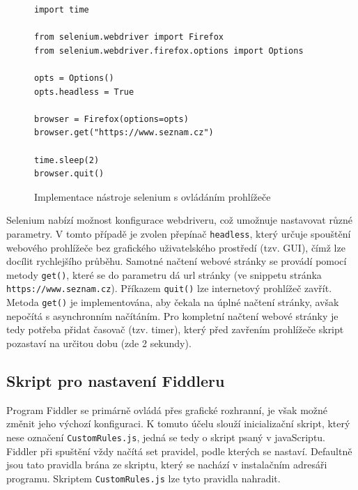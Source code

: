 \documentclass[thesis=M,czech,hidelinks]{FITthesis}[2013/05/06]
\begin{document}
\begin{figure}[h]               
\begin{verbatim}
import time

from selenium.webdriver import Firefox
from selenium.webdriver.firefox.options import Options

opts = Options()
opts.headless = True

browser = Firefox(options=opts)
browser.get("https://www.seznam.cz")

time.sleep(2)
browser.quit()
\end{verbatim}      
\caption{Implementace nástroje selenium s ovládáním prohlížeče}
\label{snip:selenium}
\end{figure}
Selenium nabízí možnost konfigurace webdriveru, což umožnuje nastavovat různé parametry. V tomto případě je zvolen přepínač \texttt{headless}, který určuje spouštění webového prohlížeče bez grafického uživatelského prostředí (tzv. GUI), čímž lze docílit rychlejšího průběhu. Samotné načtení webové stránky se provádí pomocí metody \texttt{get()}, které se do parametru dá url stránky (ve snippetu stránka \texttt{https://www.seznam.cz}). Příkazem \texttt{quit()} lze internetový prohlížeč zavřít. Metoda \texttt{get()} je implementována, aby čekala na úplné načtení stránky, avšak nepočítá s asynchronním načítáním. Pro kompletní načtení webové stránky je tedy potřeba přidat časovač (tzv. timer), který před zavřením prohlížeče skript pozastaví na určitou dobu (zde 2 sekundy).




\subsection{Skript pro nastavení Fiddleru}\label{sec:fiddler_setup}
Program Fiddler se primárně ovládá přes grafické rozhranní, je však možné změnit jeho výchozí konfiguraci. K tomuto účelu slouží inicializační skript, který nese označení \texttt{CustomRules.js}, jedná se tedy o skript psaný v javaScriptu. Fiddler při spuštění vždy načítá set pravidel, podle kterých se nastaví. Defaultně jsou tato pravidla brána ze skriptu, který se nachází v instalačním adresáři programu. Skriptem \texttt{CustomRules.js} lze tyto pravidla nahradit.
\end{document}
